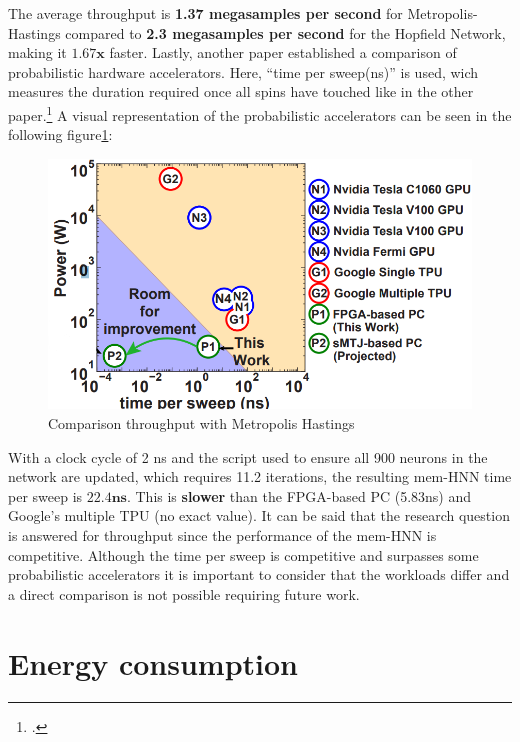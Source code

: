 The average throughput is \textbf{1.37 megasamples per second} for Metropolis-Hastings compared to \textbf{2.3 megasamples per second} for the Hopfield Network, making it \(\mathbf{1.67x}\) faster.
Lastly, another paper established a comparison of probabilistic hardware accelerators. Here, ``time per sweep(ns)'' is used, wich measures the duration required
once all spins have touched like in the other paper.\footcite[cf.][2]{aaditAcceleratingAdaptiveParallel2023}
A visual representation of the probabilistic accelerators can be seen in the following figure\ref{Comparison_throughput_literature_2}:
\begin{figure}[H]
    \centering
    \includegraphics[width=0.50\linewidth]{graphics/Troughput_comparison.png}
    \caption{Comparison throughput with Metropolis Hastings}
    \label{Comparison_throughput_literature_2}
\end{figure}
With a clock cycle of 2 ns and the script used to ensure all 900 neurons in the network are updated, which requires 11.2 iterations, the resulting \ac{mem-HNN} time per sweep is \(\mathbf{22.4ns}\).
This is \textbf{slower} than the \ac{FPGA}-based PC (5.83ns) and Google’s multiple TPU (no exact value). 
It can be said that the research question is answered for throughput since the performance of the \ac{mem-HNN} is competitive. 
Although the time per sweep is competitive and surpasses some probabilistic accelerators it is important to consider that the workloads differ and a direct comparison is not possible requiring future work.
\section{Energy consumption}

